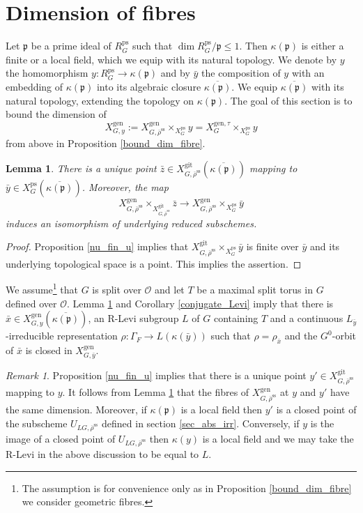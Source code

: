 \documentclass{amsart}
\newtheorem{lem}[prop]{Lemma}
\theoremstyle{definition}
\theoremstyle{remark}
\newtheorem{remar}[prop]{Remark}
\DeclareMathOperator{\GL}{GL}
\newcommand{\OO}{\mathcal O}
\newcommand{\pp}{\mathfrak p}
\newcommand{\rhobar}{\overline{\rho}}
\newcommand{\ps}{\mathrm{ps}}
\newcommand{\gen}{\mathrm{gen}}
\newcommand{\gps}{\mathrm{git}}
\newcommand{\RpsGLd}{R^{\ps}_{\GL_d}}
\newcommand{\XgenGtau}{X^{\gen, \tau}_G}
\newcommand{\xbar}{\bar{x}}
\newcommand{\rhobarss}{\rhobar^{\mathrm{ss}}}
\newcommand{\ybar}{\bar{y}}
\renewcommand{\xbar}{\bar{x}}
\newcommand{\XpsG}{X^{\ps}_G}
\newcommand{\zbar}{\bar{z}}
\begin{document}
 \section{Dimension of fibres}\label{sec_dim_fib}

Let $\pp$ be a prime ideal of $R^{\ps}_G$ such that $\dim R^{\ps}_G/\pp \le 1$. 
Then $\kappa(\pp)$ is either a finite or  a local field, which we equip with its natural topology. 
We denote by $y$ the homomorphism 
$y: R^{\ps}_{G} \rightarrow \kappa(\pp)$ and by $\ybar$ the composition of $y$ with an 
embedding of $\kappa(\pp)$ into its algebraic closure $\overline{\kappa(\pp)}$. We equip 
$\overline{\kappa(\pp)}$ with its natural topology, extending the topology on $\kappa(\pp)$. 
The goal of this section is to bound the dimension of 
$$ X^{\gen}_{G, y}:= X^{\gen}_{G, \rhobarss} \times_{X^{\ps}_G} y = \XgenGtau\times_{X^{\ps}_{G}} y$$
from above in Proposition \ref{bound_dim_fibre}. 

\begin{lem}\label{fib_gps_ps} There is a unique point $\zbar\in X^{\gps}_{G, \rhobarss}(\overline{\kappa(\pp)})$ mapping to $\ybar\in \XpsG(\overline{\kappa(\pp)})$. 
Moreover, the map 
$$X^{\gen}_{G, \rhobarss}\times_{X^{\gps}_{G, \rhobarss}} \zbar\rightarrow X^{\gen}_{G, \rhobarss}\times_{X^{\ps}_{G}} \ybar$$
induces an isomorphism of underlying reduced subschemes.
\end{lem}
\begin{proof} Proposition \ref{nu_fin_u} implies that $X^{\gps}_{G, \rhobarss}\times_{X^{\ps}_{G}} \ybar$
is finite over $\ybar$ and its underlying topological space is a point. This implies the assertion. 
\end{proof} 




We assume\footnote{The assumption is for convenience only as in Proposition \ref{bound_dim_fibre} we consider geometric fibres.} that $G$ is split over $\OO$ and let $T$ be a maximal split torus in $G$ defined over $\OO$. Lemma \ref{fib_gps_ps} and Corollary \ref{conjugate_Levi} imply that 
there is $\xbar\in X^{\gen}_{G, y}(\overline{\kappa(\pp)})$, an R-Levi subgroup $L$ of $G$ containing $T$ and a continuous $L_{\ybar}$-irreducible representation 
$\rho: \Gamma_F \rightarrow L(\kappa(\ybar))$ such that $\rho=\rho_{\xbar}$ and the $G^0$-orbit of $\xbar$ is
closed in $X^{\gen}_{G, \ybar}$. 

\begin{remar}\label{rel_to_ULG} Proposition \ref{nu_fin_u} implies that there is a unique point 
$y'\in X^{\gps}_{G, \rhobarss}$  mapping to $y$. It follows from  Lemma \ref{fib_gps_ps}  
that the fibres of $X^{\gen}_{G, \rhobarss}$ at $y$ and $y'$ have the same dimension.
Moreover, if $\kappa(\pp)$ is a local field then $y'$ is a closed point of the subscheme $U_{LG, \rhobarss}$ defined in section \ref{sec_abs_irr}. Conversely, if $y$ is the image of a closed point of $U_{LG, \rhobarss}$ then $\kappa(y)$ is a local field and we may take  the R-Levi in the above discussion to be equal to $L$.
\end{remar} 
 
\end{document}

